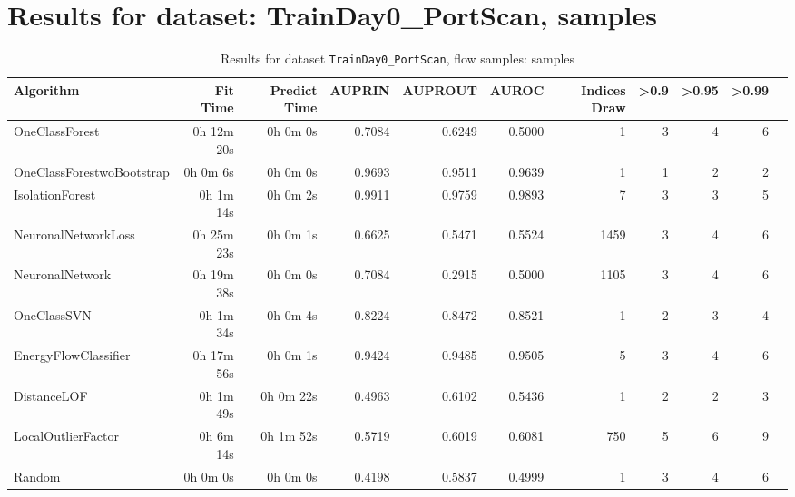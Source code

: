\documentclass{article}
\begin{document}
\section*{Results for dataset: TrainDay0_PortScan, samples}
\begin{table}[h!]
\centering
\caption{Results for dataset \texttt{TrainDay0_PortScan}, flow samples: samples}
\label{tab:trainday0portscan_samples}
\begin{tabular}{lrrrrrrrrrr}
\toprule
Algorithm & Fit Time & Predict Time & AUPRIN & AUPROUT & AUROC & Indices Draw & >0.9 & >0.95 & >0.99 \\
\midrule
OneClassForest & 0h 12m 20s & 0h 0m 0s & 0.7084 & 0.6249 & 0.5000 & 1 & 3 & 4 & 6 \\
OneClassForestwoBootstrap & 0h 0m 6s & 0h 0m 0s & 0.9693 & 0.9511 & 0.9639 & 1 & 1 & 2 & 2 \\
IsolationForest & 0h 1m 14s & 0h 0m 2s & 0.9911 & 0.9759 & 0.9893 & 7 & 3 & 3 & 5 \\
NeuronalNetworkLoss & 0h 25m 23s & 0h 0m 1s & 0.6625 & 0.5471 & 0.5524 & 1459 & 3 & 4 & 6 \\
NeuronalNetwork & 0h 19m 38s & 0h 0m 0s & 0.7084 & 0.2915 & 0.5000 & 1105 & 3 & 4 & 6 \\
OneClassSVN & 0h 1m 34s & 0h 0m 4s & 0.8224 & 0.8472 & 0.8521 & 1 & 2 & 3 & 4 \\
EnergyFlowClassifier & 0h 17m 56s & 0h 0m 1s & 0.9424 & 0.9485 & 0.9505 & 5 & 3 & 4 & 6 \\
DistanceLOF & 0h 1m 49s & 0h 0m 22s & 0.4963 & 0.6102 & 0.5436 & 1 & 2 & 2 & 3 \\
LocalOutlierFactor & 0h 6m 14s & 0h 1m 52s & 0.5719 & 0.6019 & 0.6081 & 750 & 5 & 6 & 9 \\
Random & 0h 0m 0s & 0h 0m 0s & 0.4198 & 0.5837 & 0.4999 & 1 & 3 & 4 & 6 \\
\bottomrule
\end{tabular}
\end{table}
\end{document}
